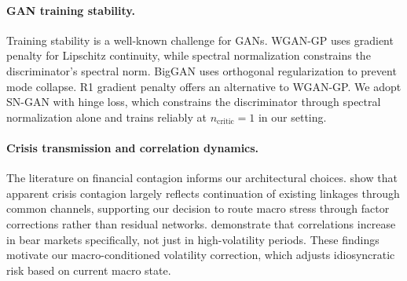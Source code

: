 \paragraph{GAN training stability.}
Training stability is a well-known challenge for GANs. 
WGAN-GP \citep{gulrajani2017improved} uses gradient penalty for Lipschitz continuity, while spectral normalization \citep{miyato2018spectral} constrains the discriminator's spectral norm. 
BigGAN \citep{brock2019large} uses orthogonal regularization to prevent mode collapse. 
R1 gradient penalty \citep{mescheder2018training} offers an alternative to WGAN-GP. 
We adopt SN-GAN with hinge loss, which constrains the discriminator through spectral normalization alone and trains reliably at $n_{\text{critic}}=1$ in our setting.

\paragraph{Crisis transmission and correlation dynamics.}
The literature on financial contagion informs our architectural choices. 
\citet{forbes2002no} show that apparent crisis contagion largely reflects continuation of existing linkages through common channels, supporting our decision to route macro stress through factor corrections rather than residual networks. 
\citet{longin2001extreme} demonstrate that correlations increase in bear markets specifically, not just in high-volatility periods. 
These findings motivate our macro-conditioned volatility correction, which adjusts idiosyncratic risk based on current macro state.
